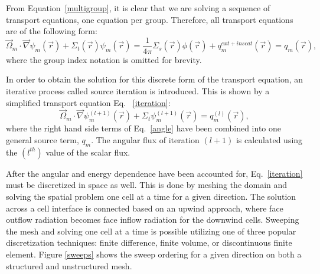 \documentclass[11pt, letterpaper,titlepage,oneside]{article}
\newcommand{\vr}{\vec{r}}
\newcommand{\vo}{\vec{\Omega}}
\begin{document}
From Equation~\eqref{multigroup}, it is clear that we are solving a sequence of transport equations, one equation per group. Therefore, all transport equations are of the following form:
\begin{equation}
\vo_m \cdot \vec \nabla \psi_{m}(\vr) +\Sigma_{t}(\vr) \psi_{m}(\vr)  = \frac{1}{4\pi}\Sigma_{s}(\vr)\phi(\vr) + q^{ext+inscat}_m(\vr) = q_m(\vr),
\end{equation}
where the group index notation is omitted for brevity.

In order to obtain the solution for this discrete form of the transport equation, an iterative process called source iteration is introduced. This is shown by a simplified transport equation Eq. ~\eqref{iteration}:
\begin{equation}
\vo_m \cdot \vec\nabla \psi_m^{(l+1)}(\vr) + \Sigma_t \psi_m^{(l+1)}(\vr) = q_m^{(l)}(\vr),
\label{iteration}
\end{equation}
where the right hand side terms of Eq.~\eqref{angle} have been combined into one general source term, $q_m$. The angular flux of iteration $(l+1)$ is calculated using the $(l^{th})$ value of the scalar flux.

After the angular and energy dependence have been accounted for, Eq.~\eqref{iteration} must be discretized in space as well. This is done by meshing the domain and solving the spatial problem one cell at a time for a given direction. The solution across a cell interface is connected based on an upwind approach, where face outflow radiation becomes face inflow radiation for the downwind cells. Sweeping the mesh and solving one cell at a time is possible utilizing one of three popular discretization techniques: finite difference\cite{fd}, finite volume\cite{fd}, or discontinuous finite element\cite{Reed}. Figure \ref{sweeps} shows the sweep ordering for a given direction on both a structured and unstructured mesh.
\end{document}
